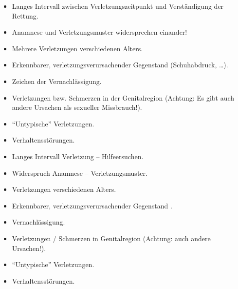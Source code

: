 {
\begin{itemize}
  \item Langes Intervall zwischen  Verletzungszeitpunkt und Verständigung der
  Rettung.
  \item Anamnese und Verletzungsmuster  widersprechen einander!
  \item Mehrere Verletzungen verschiedenen Alters.
  \item Erkennbarer, verletzungsverursachender Gegenstand (Schuhabdruck,
  \ldots).
  \item Zeichen der Vernachlässigung.
  \item Verletzungen bzw. Schmerzen in der Genitalregion (Achtung: Es gibt auch andere
  Ursachen als sexueller Missbrauch!).
  \item "`Untypische"' Verletzungen.
  \item Verhaltensstörungen.
\end{itemize}
}{
\begin{itemize}
  \item Langes Intervall Verletzung -- Hilfeersuchen.
  \item Widerspruch Anamnese -- Verletzungsmuster.
  \item Verletzungen verschiedenen Alters.
  \item Erkennbarer, verletzungsverursachender Gegenstand .
  \item Vernachlässigung.
  \item Verletzungen / Schmerzen in Genitalregion (Achtung: auch andere
  Ursachen!).
  \item "`Untypische"' Verletzungen.
  \item Verhaltensstörungen.
\end{itemize}
}{}{}{}



